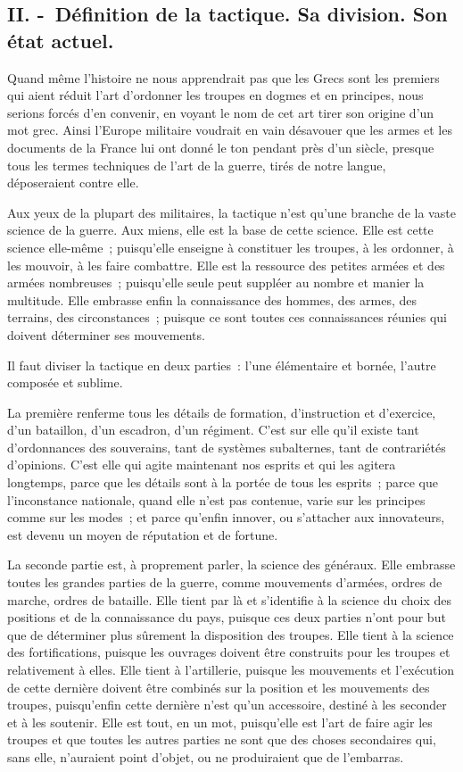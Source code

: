 \documentclass[french,twoside]{book} %
\begin{document}
\subsection[{II. - Définition de la tactique. Sa division. Son état actuel.}]{II. - Définition de la tactique. Sa division. Son état actuel.}
\noindent Quand même l’histoire ne nous apprendrait pas que les Grecs sont les premiers qui aient réduit l’art d’ordonner les troupes en dogmes et en principes, nous serions forcés d’en convenir, en voyant le nom de cet art tirer son origine d’un mot grec. Ainsi l’Europe militaire voudrait en vain désavouer que les armes et les documents de la France lui ont donné le ton pendant près d’un siècle, presque tous les termes techniques de l’art de la guerre, tirés de notre langue, déposeraient contre elle.\par
Aux yeux de la plupart des militaires, la tactique n’est qu’une branche de la vaste science de la guerre. Aux miens, elle est la base de cette science. Elle est cette science elle-même ; puisqu’elle enseigne à constituer les troupes, à les ordonner, à les mouvoir, à les faire combattre. Elle est la ressource des petites armées et des armées nombreuses ; puisqu’elle seule peut suppléer au nombre et manier la multitude. Elle embrasse enfin la connaissance des hommes, des armes, des terrains, des circonstances ; puisque ce sont toutes ces connaissances réunies qui doivent déterminer ses mouvements.\par
Il faut diviser la tactique en deux parties : l’une élémentaire et bornée, l’autre composée et sublime.\par
La première renferme tous les détails de formation, d’instruction et d’exercice, d’un bataillon, d’un escadron, d’un régiment. C’est sur elle qu’il existe tant d’ordonnances des souverains, tant de systèmes subalternes, tant de contrariétés d’opinions. C’est elle qui agite maintenant nos esprits et qui les agitera longtemps, parce que les détails sont à la portée de tous les esprits ; parce que l’inconstance nationale, quand elle n’est pas contenue, varie sur les principes comme sur les modes ; et parce qu’enfin innover, ou s’attacher aux innovateurs, est devenu un moyen de réputation et de fortune.\par
La seconde partie est, à proprement parler, la science des généraux. Elle embrasse toutes les grandes parties de la guerre, comme mouvements d’armées, ordres de marche, ordres de bataille. Elle tient par là et s’identifie à la science du choix des positions et de la connaissance du pays, puisque ces deux parties n’ont pour but que de déterminer plus sûrement la disposition des troupes. Elle tient à la science des fortifications, puisque les ouvrages doivent être construits pour les troupes et relativement à elles. Elle tient à l’artillerie, puisque les mouvements et l’exécution de cette dernière doivent être combinés sur la position et les mouvements des troupes, puisqu’enfin cette dernière n’est qu’un accessoire, destiné à les seconder et à les soutenir. Elle est tout, en un mot, puisqu’elle est l’art de faire agir les troupes et que toutes les autres parties ne sont que des choses secondaires qui, sans elle, n’auraient point d’objet, ou ne produiraient que de l’embarras.\par
\end{document}
